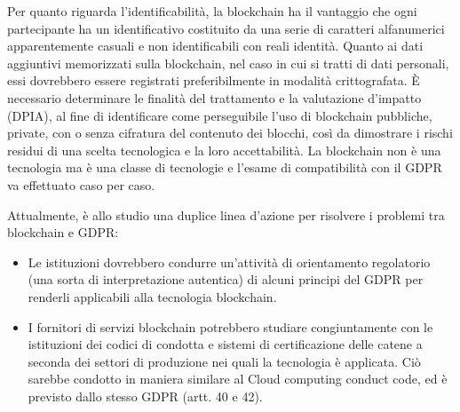 Per quanto riguarda l’identificabilità, la blockchain ha il vantaggio che
ogni partecipante ha un identificativo costituito da una serie di
caratteri alfanumerici apparentemente casuali e non identificabili con
reali identità. Quanto ai dati aggiuntivi memorizzati sulla blockchain,
nel caso in cui si tratti di dati personali, essi dovrebbero essere
registrati preferibilmente in modalità crittografata.
È necessario determinare le finalità del trattamento e la valutazione
d’impatto (DPIA), al fine di identificare come perseguibile l’uso di
blockchain pubbliche, private, con o senza cifratura del contenuto dei
blocchi, così da dimostrare i rischi residui di una scelta tecnologica e la
loro accettabilità.
La blockchain non è una tecnologia ma è una classe di tecnologie e
l’esame di compatibilità con il GDPR va effettuato caso per caso.

Attualmente, è allo studio una duplice linea d’azione per risolvere i
problemi tra blockchain e GDPR:
\begin{itemize}
    \item Le istituzioni dovrebbero condurre un'attività di
orientamento regolatorio (una sorta di
interpretazione autentica) di alcuni principi del
GDPR per renderli applicabili alla tecnologia
blockchain.
    \item I fornitori di servizi blockchain potrebbero studiare
congiuntamente con le istituzioni dei codici di
condotta e sistemi di certificazione delle catene a
seconda dei settori di produzione nei quali la
tecnologia è applicata.
Ciò sarebbe condotto in maniera similare al Cloud
computing conduct code, ed è previsto dallo stesso
GDPR (artt. 40 e 42).
\end{itemize}

